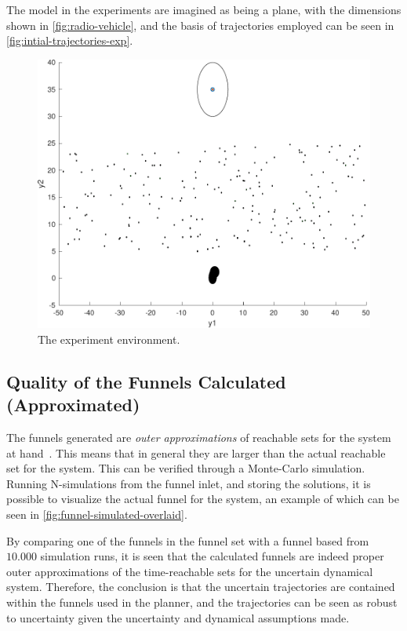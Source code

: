The model in the experiments are imagined as being a plane, with the dimensions
shown in \cref{fig:radio-vehicle}, and the basis of trajectories employed can be
seen in \cref{fig:intial-trajectories-exp}.

\begin{figure}[!t]
  \centering
  \includegraphics[width=.8\columnwidth]{figures/experiments/simulated-forest}
  \caption{The experiment environment.}
  \label{fig:simulated-forest}
\end{figure}

\subsection{Quality of the Funnels Calculated (Approximated)}

The funnels generated are \textit{outer approximations} of reachable sets for
the system at hand~\cite{majumdarFunnelLibrariesRealtime2017}. This means that
in general they are larger than the actual reachable set for the system. This
can be verified through a Monte-Carlo simulation. Running N-simulations from the
funnel inlet, and storing the solutions, it is possible to visualize the actual
funnel for the system, an example of which can be seen in
\cref{fig:funnel-simulated-overlaid}.

By comparing one of the funnels in the funnel set with a funnel based from
\(10.000\) simulation runs, it is seen that the calculated funnels are indeed
proper outer approximations of the time-reachable sets for the uncertain
dynamical system. Therefore, the conclusion is that the uncertain trajectories
are contained within the funnels used in the planner, and the trajectories can
be seen as robust to uncertainty given the uncertainty and dynamical assumptions
made.


